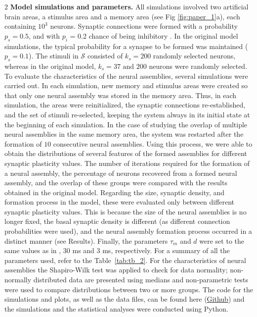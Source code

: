 \documentclass[a4paper, 10pt]{article}
\begin{document}
\begin{multicols}{2}
\noindent\textbf{Model simulations and parameters.} All simulations involved two artificial brain areas, a stimulus area and a memory area (see Fig \ref{fig:paper_1}a), each containing $10^3$
neurons. Synaptic connections were formed with a probability 
$p_s=0.5$, and with 
$p_i$ = 0.2 chance of being inhibitory \cite{Sahara2012}. In the original model simulations, the typical probability for a synapse to be formed was maintained ($p_s = 0.1$). The stimuli in $\mathcal{S}$  consisted of $k_s = 200$ randomly selected neurons, whereas in the original model, $k_s = 37\text{ and } 200$ neurons were randomly selected. To evaluate the characteristics of the neural assemblies, several simulations were carried out. In each simulation, new memory and stimulus areas were created so that only one neural assembly was stored in the memory area. Thus, in each simulation, the areas were reinitialized, the synaptic connections re-established, and the set of stimuli re-selected, keeping the system always in its initial state at the beginning of each simulation. In the case of studying the overlap of multiple neural assemblies in the same memory area, the system was restarted after the formation of $10$ consecutive neural assemblies. Using this process, we were able to obtain the distributions of several features of the formed assemblies for different synaptic plasticity values. The number of iterations required for the formation of a neural assembly, the percentage of neurons recovered from a formed neural assembly, and the overlap of these groups were compared with the results obtained in the original model. Regarding the size, synaptic density, and formation process in the model, these were evaluated only between different synaptic plasticity values. This is because the size of the neural assemblies is no longer fixed, the basal synaptic density is different (as different connection probabilities were used), and the neural assembly formation process occurred in a distinct manner (see Results). Finally, the parameters $\tau_m$ and $d$ were set to the same values as in \cite{licurgo}, 30 ms and 3 ms, respectively. For a summary of all the parameters used, refer to the Table~\ref{tab:tb_2}. For the characteristics of neural assemblies the Shapiro-Wilk test was applied to check for data normality; non-normally distributed data are presented using medians and non-parametric tests were used to compare distributions between two or more groups. The code for the simulations and plots, as well as the data files, can be found here (\href{https://github.com/Solution-Epsilon/AC_Emax}{Github}) and the simulations and the statistical analyses were conducted using Python.
\end{multicols}
\end{document}

